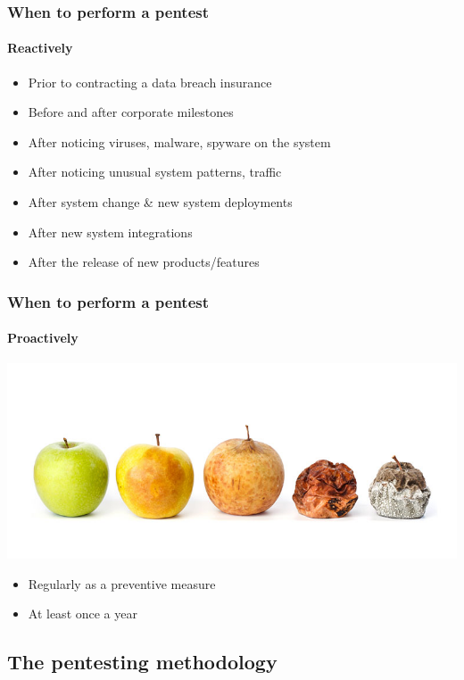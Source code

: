 \begin{frame}
    \frametitle{When to perform a pentest}
    \framesubtitle{Reactively}
    
    \note[item]{
    }
    
    	\begin{itemize}
    		\item Prior to contracting a data breach insurance
    		\item Before and after corporate milestones
    		\item After noticing viruses, malware, spyware on the system
    		\item After noticing unusual system patterns, traffic
    		\item After system change \& new system deployments
    		\item After new system integrations
    		\item After the release of new products/features    		
    	\end{itemize}
\end{frame}

\begin{frame}
    \frametitle{When to perform a pentest}
    \framesubtitle{Proactively}
        
    \note[item]{
    }

	\includegraphics[width=\linewidth]{rotten-apples.jpg}    
    
    	\begin{itemize}
    		\item Regularly as a preventive measure    	
    		\item At least once a year
    	\end{itemize}
\end{frame}

\subsection{The pentesting methodology}

